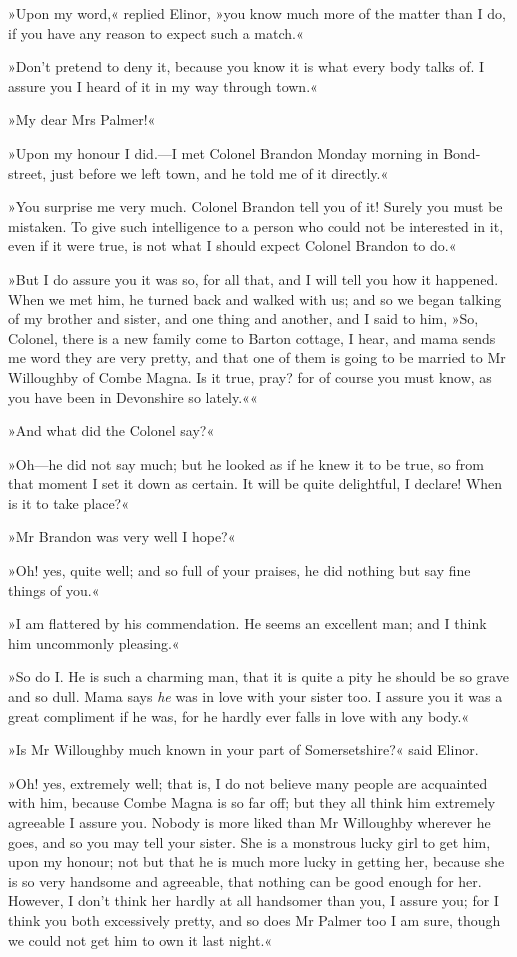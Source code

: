 »Upon my word,« replied Elinor, »you know much more of the matter than I do, if you have any reason to expect such a match.«

»Don’t pretend to deny it, because you know it is what every body talks of. I assure you I heard of it in my way through town.«

»My dear Mrs Palmer!«

»Upon my honour I did.—I met Colonel Brandon Monday morning in Bond-street, just before we left town, and he told me of it directly.«

»You surprise me very much. Colonel Brandon tell you of it! Surely you must be mistaken. To give such intelligence to a person who could not be interested in it, even if it were true, is not what I should expect Colonel Brandon to do.«

»But I do assure you it was so, for all that, and I will tell you how it happened. When we met him, he turned back and walked with us; and so we began talking of my brother and sister, and one thing and another, and I said to him, »So, Colonel, there is a new family come to Barton cottage, I hear, and mama sends me word they are very pretty, and that one of them is going to be married to Mr Willoughby of Combe Magna. Is it true, pray? for of course you must know, as you have been in Devonshire so lately.««

»And what did the Colonel say?«

»Oh—he did not say much; but he looked as if he knew it to be true, so from that moment I set it down as certain. It will be quite delightful, I declare! When is it to take place?«

»Mr Brandon was very well I hope?«

»Oh! yes, quite well; and so full of your praises, he did nothing but say fine things of you.«

»I am flattered by his commendation. He seems an excellent man; and I think him uncommonly pleasing.«

»So do I. He is such a charming man, that it is quite a pity he should be so grave and so dull. Mama says \textit{he} was in love with your sister too. I assure you it was a great compliment if he was, for he hardly ever falls in love with any body.«

»Is Mr Willoughby much known in your part of Somersetshire?« said Elinor.

»Oh! yes, extremely well; that is, I do not believe many people are acquainted with him, because Combe Magna is so far off; but they all think him extremely agreeable I assure you. Nobody is more liked than Mr Willoughby wherever he goes, and so you may tell your sister. She is a monstrous lucky girl to get him, upon my honour; not but that he is much more lucky in getting her, because she is so very handsome and agreeable, that nothing can be good enough for her. However, I don’t think her hardly at all handsomer than you, I assure you; for I think you both excessively pretty, and so does Mr Palmer too I am sure, though we could not get him to own it last night.«

